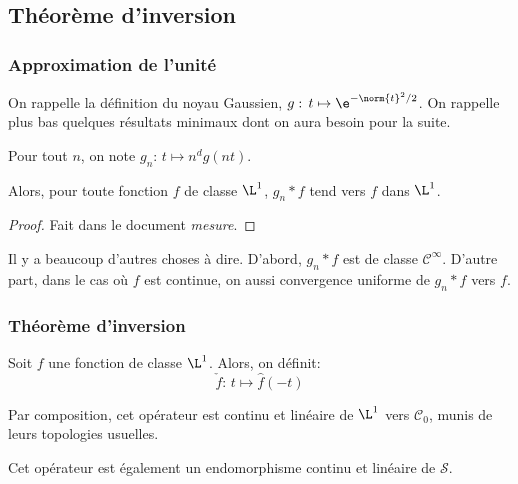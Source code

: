 \subsection{Théorème d'inversion}

\subsubsection{Approximation de l'unité}

On rappelle la définition du noyau Gaussien, $g: \, t \mapsto \e^{-\norm{t}^2/2}$. On rappelle plus bas quelques résultats minimaux dont on aura besoin pour la suite.

\begin{prop}
Pour tout $n$, on note $g_n: \, t \mapsto n^d g(nt)$.

\medskip
Alors, pour toute fonction $f$ de classe $\L^1$, $g_n*f$ tend vers $f$ dans $\L^1$.
\end{prop}


\begin{proof}
Fait dans le document \emph{mesure}.
\end{proof}

\begin{listremarques}
\item
Il y a beaucoup d'autres choses à dire. D'abord, $g_n*f$ est de classe $\mathcal{C}^{\infty}$. D'autre part, dans le cas où $f$ est continue, on aussi convergence uniforme de $g_n*f$ vers $f$.
\end{listremarques}


\subsubsection{Théorème d'inversion}

\begin{de}
Soit $f$ une fonction de classe $\L^1$. Alors, on définit:
\[
\check{f}: \, t \mapsto \widehat{f}(-t)
\]
\end{de}

\begin{listremarques}
\item 
Par composition, cet opérateur est continu et linéaire de $\L^1$ vers $\mathcal{C}_0$, munis de leurs topologies usuelles.
\item 
Cet opérateur est également un endomorphisme continu et linéaire de $\mathcal{S}$.
\end{listremarques}


